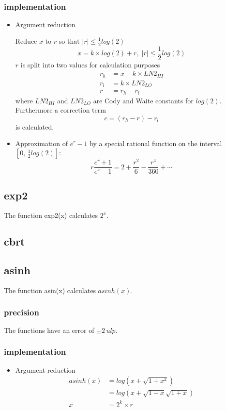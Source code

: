 \documentclass[10pt,a4paper]{article}
\numberwithin{equation}{subsection}
\begin{document}
\subsubsection{implementation}
\begin{itemize}
\item Argument reduction

    Reduce $x$ to $r$ so that $ |r| \le \frac{1}{2} log(2) $
    \begin{equation}
        x = k \times log(2) + r, \; |r| \le \frac{1}{2} log(2)
    \end{equation}
    $r$ is split into two values for calculation purposes
    \[
       \begin{aligned}
       r_h &= x - k \times LN2_{HI} \\
       r_l &= k \times LN2_{LO} \\
       r &= r_h - r_l
       \end{aligned}
    \]
    where $LN2_{HI}$ and $LN2_{LO}$ are Cody and Waite constants for $log(2)$.
    Furthermore a correction term
    \[
        c = (r_h - r) - r_l
    \]
    is calculated.

\item Approximation of $e^r-1$ by a special rational function on the interval
    $[0,\,\frac{1}{2}log(2)]$:
    \[
        r \frac{e^{r}+1}{e^{r}-1} =
        2+\frac{r^2}{6}-\frac{r^4}{360}+\cdots
    \]

\end{itemize}

\subsection{exp2}
The function exp2(x) calculates $ 2^x $.

\subsection{cbrt}

\subsection{asinh}
\label{sub_sec:asin}
The function asin(x) calculates $ asinh(x) $.

\subsubsection{precision}
The functions have an error of $ \pm 2\, ulp$.

\subsubsection{implementation}
\begin{itemize}
\item Argument reduction
    \[
        \begin{aligned}
          asinh(x) &= log(x+\sqrt{1+x^2}) \\
                   &= log(x+\sqrt{1-x}\sqrt{1+x}) \\
          x &= 2^k\times r 
        \end{aligned}
    \]
\end{itemize}
  
\end{document}
